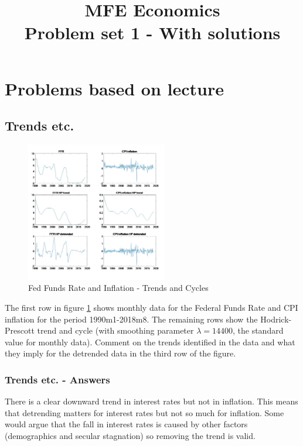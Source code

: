 \documentclass[authoryear,11pt]{elsarticle}
\begin{document}
\begin{frontmatter}
\title{MFE Economics\\Problem set 1 - With solutions}
\end{frontmatter}


\section{Problems based on lecture}

\subsection{Trends etc.}
\begin{figure}[!h]
\caption[Fed Funds Rate and Inflation]{Fed Funds Rate and Inflation - Trends and Cycles}
\centering
\label{fig:macro_series}
\includegraphics[width=0.55\textwidth]{macro_series.JPG}
\end{figure}

The first row in figure \ref{fig:macro_series} shows monthly data for the Federal Funds Rate and CPI inflation for the period 1990m1-2018m8. The remaining rows show the Hodrick-Prescott trend and cycle (with smoothing parameter $\lambda =14400$, the standard value for monthly data). Comment on the trends identified in the data and what they imply for the detrended data in the third row of the figure.

\subsubsection*{Trends etc. - Answers}
There is a clear downward trend in interest rates but not in inflation. This means that detrending matters for interest rates but not so much for inflation. Some would argue that the fall in interest rates is caused by other factors (demographics and secular stagnation) so removing the trend is valid.
\end{document}
